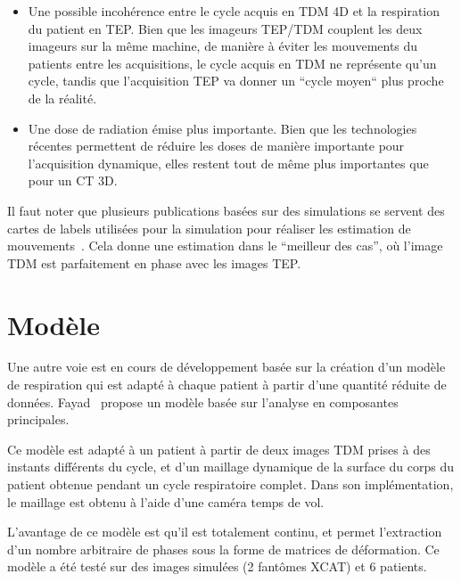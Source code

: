 \begin{itemize}
 \item Une possible incohérence entre le cycle acquis en TDM 4D et la respiration du patient en TEP. Bien que les imageurs TEP/TDM couplent les deux imageurs sur la même machine, de manière à éviter les mouvements du patients entre les acquisitions, le cycle acquis en TDM ne représente qu'un cycle, tandis que l'acquisition TEP va donner un ``cycle moyen`` plus proche de la réalité.
 \item Une dose de radiation émise plus importante. Bien que les technologies récentes permettent de réduire les doses de manière importante pour l'acquisition dynamique, elles restent tout de même plus importantes que pour un CT 3D.
\end{itemize}

Il faut noter que plusieurs publications basées sur des simulations se servent des cartes de labels utilisées pour la simulation pour réaliser les estimation de mouvements~\cite{lamare2007list}. Cela donne une estimation dans le ``meilleur des cas'', où l'image TDM est parfaitement en phase avec les images TEP.

\section{Modèle}

Une autre voie est en cours de développement basée sur la création d'un modèle de respiration qui est adapté à chaque patient à partir d'une quantité réduite de données. Fayad~\cite{fayad2010application} propose un modèle basée sur l'analyse en composantes principales. 

Ce modèle est adapté à un patient à partir de deux images TDM prises à des instants différents du cycle, et d'un maillage dynamique de la surface du corps du patient obtenue pendant un cycle respiratoire complet. Dans son implémentation, le maillage est obtenu à l'aide d'une caméra temps de vol.

L'avantage de ce modèle est qu'il est totalement continu, et permet l'extraction d'un nombre arbitraire de phases sous la forme de matrices de déformation. Ce modèle a été testé sur des images simulées (2 fantômes XCAT) et 6 patients.
